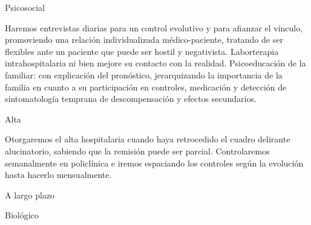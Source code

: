 \documentclass[encares.tex]{subfiles}
\begin{document}
Psicosocial

Haremos entrevistas diarias para un control evolutivo y para afianzar el vínculo, promoviendo una relación individualizada médico-paciente, tratando de ser flexibles ante un paciente que puede ser hostil y negativista. Laborterapia intrahospitalaria ni bien mejore su contacto con la realidad. Psicoeducación de la familiar: con explicación del pronóstico, jerarquizando la importancia de la familia en cuanto a su participación en controles, medicación y detección de sintomatología temprana de descompensación y efectos secundarios.

Alta

Otorgaremos el alta hospitalaria cuando haya retrocedido el cuadro delirante alucinatorio, sabiendo que la remisión puede ser parcial. Controlaremos semanalmente en policlínica e iremos espaciando los controles según la evolución hasta hacerlo mensualmente.

A largo plazo

Biológico
\end{document}
